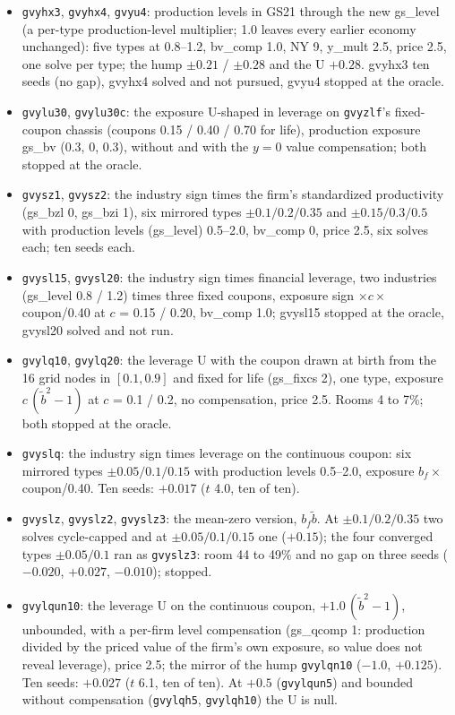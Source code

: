 \begin{itemize}
\item \texttt{gvyhx3}, \texttt{gvyhx4}, \texttt{gvyu4}: production levels in GS21 through the new gs\_level (a per-type production-level multiplier; 1.0 leaves every earlier economy unchanged): five types at 0.8--1.2, bv\_comp 1.0, NY 9, y\_mult 2.5, price 2.5, one solve per type; the hump $\pm0.21$ / $\pm0.28$ and the U $+0.28$. gvyhx3 ten seeds (no gap), gvyhx4 solved and not pursued, gvyu4 stopped at the oracle.
\item \texttt{gvylu30}, \texttt{gvylu30c}: the exposure U-shaped in leverage on \texttt{gvyzlf}'s fixed-coupon chassis (coupons 0.15 / 0.40 / 0.70 for life), production exposure gs\_bv (0.3, 0, 0.3), without and with the $y = 0$ value compensation; both stopped at the oracle.
\item \texttt{gvysz1}, \texttt{gvysz2}: the industry sign times the firm's standardized productivity (gs\_bzl 0, gs\_bzi 1), six mirrored types $\pm0.1/0.2/0.35$ and $\pm0.15/0.3/0.5$ with production levels (gs\_level) 0.5--2.0, bv\_comp 0, price 2.5, six solves each; ten seeds each.
\item \texttt{gvysl15}, \texttt{gvysl20}: the industry sign times financial leverage, two industries (gs\_level 0.8 / 1.2) times three fixed coupons, exposure sign $\times c \times$ coupon/0.40 at $c$ = 0.15 / 0.20, bv\_comp 1.0; gvysl15 stopped at the oracle, gvysl20 solved and not run.
\item \texttt{gvylq10}, \texttt{gvylq20}: the leverage U with the coupon drawn at birth from the 16 grid nodes in $[0.1, 0.9]$ and fixed for life (gs\_fixcs 2), one type, exposure $c\,(\tilde b^2 - 1)$ at $c$ = 0.1 / 0.2, no compensation, price 2.5. Rooms 4 to 7\%; both stopped at the oracle.
\item \texttt{gvyslq}: the industry sign times leverage on the continuous coupon: six mirrored types $\pm0.05/0.1/0.15$ with production levels 0.5--2.0, exposure $b_f \times$ coupon/0.40. Ten seeds: $+0.017$ ($t$ 4.0, ten of ten).
\item \texttt{gvyslz}, \texttt{gvyslz2}, \texttt{gvyslz3}: the mean-zero version, $b_f \tilde b$. At $\pm0.1/0.2/0.35$ two solves cycle-capped and at $\pm0.05/0.1/0.15$ one ($+0.15$); the four converged types $\pm0.05/0.1$ ran as \texttt{gvyslz3}: room 44 to 49\% and no gap on three seeds ($-0.020$, $+0.027$, $-0.010$); stopped.
\item \texttt{gvylqun10}: the leverage U on the continuous coupon, $+1.0\,(\tilde b^2 - 1)$, unbounded, with a per-firm level compensation (gs\_qcomp 1: production divided by the priced value of the firm's own exposure, so value does not reveal leverage), price 2.5; the mirror of the hump \texttt{gvylqn10} ($-1.0$, $+0.125$). Ten seeds: $+0.027$ ($t$ 6.1, ten of ten). At $+0.5$ (\texttt{gvylqun5}) and bounded without compensation (\texttt{gvylqh5}, \texttt{gvylqh10}) the U is null.

\end{itemize}
